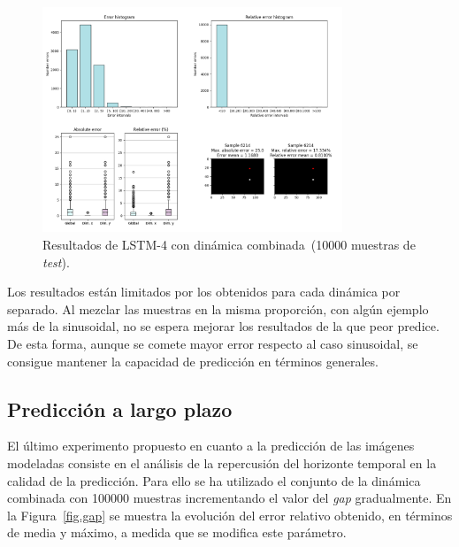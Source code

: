 \begin{figure}[H]
		\begin{center}
			\includegraphics[width=0.8\textwidth]{ figures/test_mod/REC/complex/mix_100000.png}
			\caption{Resultados de LSTM-4 con dinámica combinada~(10000 muestras de \textit{test}).} 
			\label{fig.complex_rec_mix_100000}
		\end{center}
\end{figure}
\vspace{-10pt}

Los resultados están limitados por los obtenidos para cada dinámica por separado. Al mezclar las muestras en la misma proporción, con algún ejemplo más de la sinusoidal, no se espera mejorar los resultados de la que peor predice. De esta forma, aunque se comete mayor error respecto al caso sinusoidal, se consigue mantener la capacidad de predicción en términos generales.

\subsection{Predicción a largo plazo} 
El último experimento propuesto en cuanto a la predicción de las imágenes modeladas consiste en el análisis de la repercusión del horizonte temporal en la calidad de la predicción. Para ello se ha utilizado el conjunto de la dinámica combinada con 100000 muestras incrementando el valor del \textit{gap} gradualmente. En la Figura~\ref{fig.gap} se muestra la evolución del error relativo obtenido, en términos de media y máximo, a medida que se modifica este parámetro.

